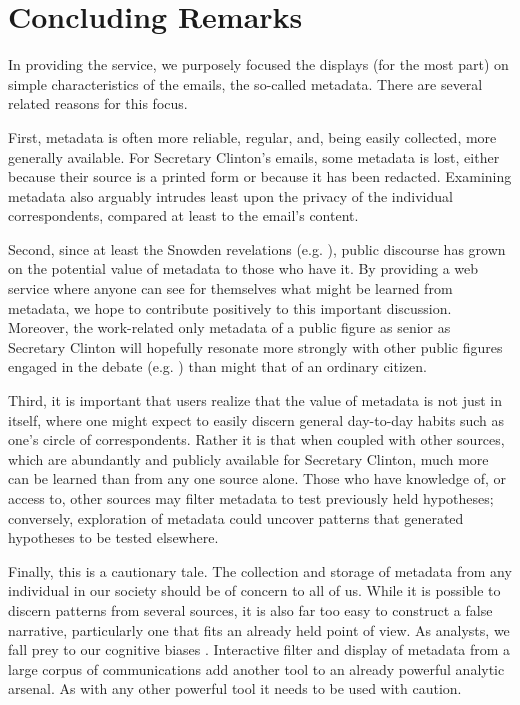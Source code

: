 \documentclass[journal]{vgtc}                %
\begin{document}
\section{Concluding Remarks}
In providing the service, we purposely focused the displays (for the most part) on simple characteristics of the emails, the so-called metadata.  There are several related reasons for this focus.  

First, metadata is often more reliable, regular, and, being easily collected, more generally available.  For Secretary Clinton's emails,  some metadata is lost, either because their source is a printed form or because it has been redacted.  Examining metadata also arguably intrudes least upon the privacy of the individual correspondents, compared at least to the email's content.  

Second, since at least the Snowden revelations (e.g. \cite{NYRsnowdenLeaks}), public discourse has grown on the potential value of metadata to those who have it.  By providing a web service where anyone can see for themselves what might be learned from metadata, we hope to contribute positively to this important discussion.  Moreover, the work-related only metadata of a public figure as senior as Secretary Clinton will hopefully resonate more strongly with other public figures  engaged in the debate (e.g.   \cite{NYRmetadata, ObamaMetadata, JebBushMetadata2015, PompeoMetadata, TrumpMetadata}) than might that of an ordinary citizen.  

Third, it is important that users realize that the value of metadata is not just in itself, where one might expect to easily discern general day-to-day habits such as one's circle of correspondents.  Rather it is that when coupled with other sources, which are abundantly and publicly available for Secretary Clinton, much more can be learned than from any one source alone.  Those who have knowledge of, or access to, other sources may filter metadata to test previously held hypotheses; conversely, exploration of metadata could uncover patterns that generated hypotheses to be tested elsewhere. 

Finally, this is a cautionary tale.  The collection and storage of metadata from any individual in our society should be of concern to all of us.  While it is possible to discern patterns from several sources, it is also far too easy to construct a false narrative, particularly one that fits an already held point of view.  As analysts, we fall prey to our cognitive biases \cite{gilgovichBook}.  Interactive filter and display of metadata from a large corpus of communications add another tool to an already powerful analytic arsenal.  As with any other powerful tool it needs to be used with caution.  


\newpage


%
%
%
%


\end{document}
